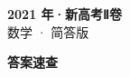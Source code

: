 \documentclass[zihao=-4, a4paper]{ctexart}
\begin{document}
\begin{center}
  {\Large\bfseries 2021 年·新高考Ⅱ卷}\\[4pt]
  {\large 数学 · 简答版}
\end{center}
\medskip
{}

\clearpage
{}
\begin{center}{\Large\bfseries 答案速查}\end{center}
\medskip

\end{document}
